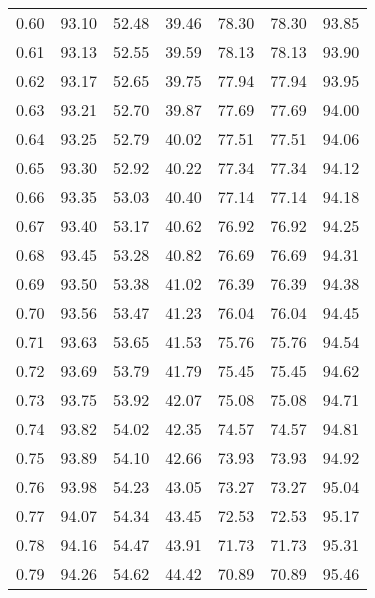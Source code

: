 \begin{tabular}{|c|c|c|c|c|c|c|}
      0.60 &     93.10 &     52.48 &      39.46 &   78.30 &      78.30 &         93.85 \\
      0.61 &     93.13 &     52.55 &      39.59 &   78.13 &      78.13 &         93.90 \\
      0.62 &     93.17 &     52.65 &      39.75 &   77.94 &      77.94 &         93.95 \\
      0.63 &     93.21 &     52.70 &      39.87 &   77.69 &      77.69 &         94.00 \\
      0.64 &     93.25 &     52.79 &      40.02 &   77.51 &      77.51 &         94.06 \\
      0.65 &     93.30 &     52.92 &      40.22 &   77.34 &      77.34 &         94.12 \\
      0.66 &     93.35 &     53.03 &      40.40 &   77.14 &      77.14 &         94.18 \\
      0.67 &     93.40 &     53.17 &      40.62 &   76.92 &      76.92 &         94.25 \\
      0.68 &     93.45 &     53.28 &      40.82 &   76.69 &      76.69 &         94.31 \\
      0.69 &     93.50 &     53.38 &      41.02 &   76.39 &      76.39 &         94.38 \\
      0.70 &     93.56 &     53.47 &      41.23 &   76.04 &      76.04 &         94.45 \\
      0.71 &     93.63 &     53.65 &      41.53 &   75.76 &      75.76 &         94.54 \\
      0.72 &     93.69 &     53.79 &      41.79 &   75.45 &      75.45 &         94.62 \\
      0.73 &     93.75 &     53.92 &      42.07 &   75.08 &      75.08 &         94.71 \\
      0.74 &     93.82 &     54.02 &      42.35 &   74.57 &      74.57 &         94.81 \\
      0.75 &     93.89 &     54.10 &      42.66 &   73.93 &      73.93 &         94.92 \\
      0.76 &     93.98 &     54.23 &      43.05 &   73.27 &      73.27 &         95.04 \\
      0.77 &     94.07 &     54.34 &      43.45 &   72.53 &      72.53 &         95.17 \\
      0.78 &     94.16 &     54.47 &      43.91 &   71.73 &      71.73 &         95.31 \\
      0.79 &     94.26 &     54.62 &      44.42 &   70.89 &      70.89 &         95.46 \\

\end{tabular}
